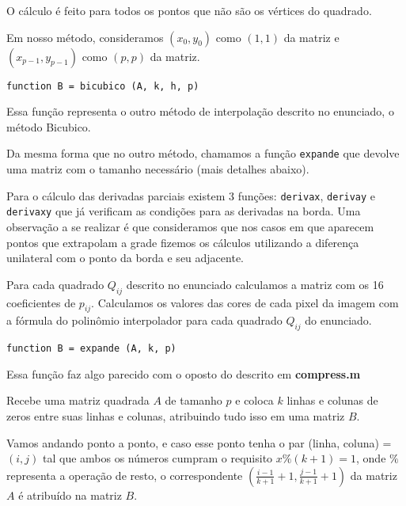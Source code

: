 \documentclass[12pt,letterpaper]{article}
\begin{document}
    O cálculo é feito para todos os pontos que não são os vértices do quadrado.

    Em nosso método, consideramos $(x_0, y_0)$ como $(1, 1)$ da matriz e $(x_{p-1}, y_{p-1})$ como $(p, p)$ da matriz.

    \begin{center}
        \texttt{function B = bicubico (A, k, h, p)}
    \end{center}

    Essa função representa o outro método de interpolação descrito no enunciado, o método Bicubico.

    Da mesma forma que no outro método, chamamos a função \texttt{expande} que devolve uma matriz com o tamanho necessário (mais detalhes abaixo).

    Para o cálculo das derivadas parciais existem 3 funções: \texttt{derivax}, \texttt{derivay} e \texttt{derivaxy} que já verificam as condições para as derivadas na borda. Uma observação a se realizar é que consideramos que nos casos em que aparecem pontos que extrapolam a grade fizemos os cálculos utilizando a diferença unilateral com o ponto da borda e seu adjacente.

    Para cada quadrado $Q_{ij}$ descrito no enunciado calculamos a matriz com os 16 coeficientes de $p_{ij}$. Calculamos os valores das cores de cada pixel da imagem com a fórmula do polinômio interpolador para cada quadrado $Q_{ij}$ do enunciado.

    \begin{center}
        \texttt{function B = expande (A, k, p)}
    \end{center}

    Essa função faz algo parecido com o oposto do descrito em \textbf{compress.m}

    Recebe uma matriz quadrada $A$ de tamanho $p$ e coloca $k$ linhas e colunas de zeros entre suas linhas e colunas, atribuindo tudo isso em uma matriz $B$.

    Vamos andando ponto a ponto, e caso esse ponto tenha o par (linha, coluna) = $(i, j)$ tal que ambos os números cumpram o requisito $x\%(k+1)=1$, onde $\%$ representa a operação de resto, o correspondente $(\frac{i-1}{k+1}+1, \frac{j-1}{k+1}+1)$ da matriz $A$ é atribuído na matriz $B$.
\end{document}
